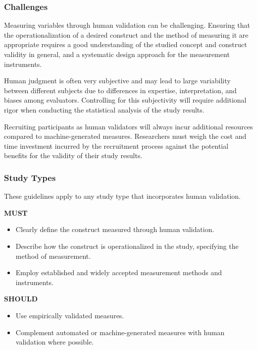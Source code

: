 \subsubsection{Challenges}

Measuring variables through human validation can be challenging.
Ensuring that the operationalization of a desired construct and the method of measuring it are appropriate requires a good understanding of the studied concept and construct validity in general, and a systematic design approach for the measurement instruments.

Human judgment is often very subjective and may lead to large variability between different subjects due to differences in expertise, interpretation, and biases among evaluators.
Controlling for this subjectivity will require additional rigor when conducting the statistical analysis of the study results.

Recruiting participants as human validators will always incur additional resources compared to machine-generated measures.
Researchers must weigh the cost and time investment incurred by the recruitment process against the potential benefits for the validity of their study results.

\subsubsection{Study Types}

These guidelines apply to any study type that incorporates human validation.

\textbf{MUST}
\begin{itemize}
    \item Clearly define the construct measured through human validation.
    \item Describe how the construct is operationalized in the study, specifying the method of measurement.
    \item Employ established and widely accepted measurement methods and instruments. 
\end{itemize}

\textbf{SHOULD}
\begin{itemize}
    \item Use empirically validated measures.
    \item Complement automated or machine-generated measures with human validation where possible.
\end{itemize}

